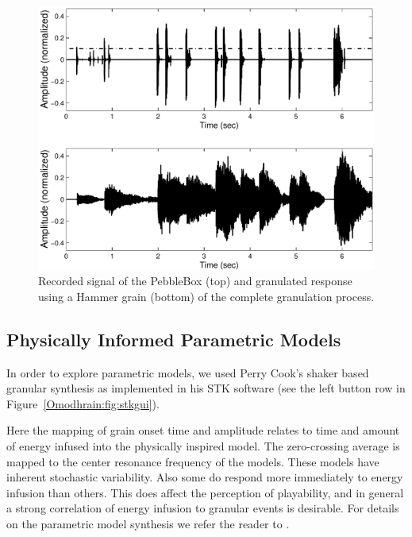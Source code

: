 \begin{figure}[t]
\centering
\includegraphics[width=\textwidth]{CompSpecPlotBW-eps-converted-to.pdf}
\caption{Recorded signal of the PebbleBox (top) and granulated response using a Hammer grain (bottom) of the complete granulation process.}
\label{Omodhrain:fig:compspec}
\end{figure}

\subsection{Physically Informed Parametric Models}

In order to explore parametric models, we used Perry Cook's shaker
based granular synthesis as implemented in his STK software
 \cite{Cook:2002}(see the left button row in Figure~\ref{Omodhrain:fig:stkgui}).

Here the mapping of grain onset time and amplitude relates to time and
amount of energy infused into the physically inspired model. The
zero-crossing average is mapped to the center resonance frequency of
the models. These models have inherent stochastic variability. Also
some do respond more immediately to energy infusion than others. This
does affect the perception of playability, and in general a strong
correlation of energy infusion to granular events is desirable. For
details on the parametric model synthesis we refer the reader to
 \cite{Cook:1997,Cook:1999b,Cook:2002}.

